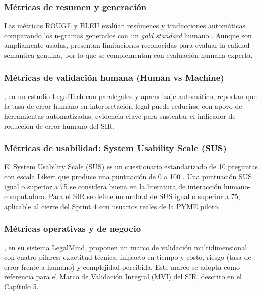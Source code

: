 \documentclass[12pt,a4paper,oneside]{report}
\begin{document}
\subsubsection{Métricas de resumen y generación}\label{subsubsec:metricas-resumen-generacion}

Las métricas ROUGE y BLEU evalúan resúmenes y traducciones automáticas comparando los n-gramas generados con un \textit{gold standard} humano \parencite{lin2004,papineni2002}. Aunque son ampliamente usadas, presentan limitaciones reconocidas para evaluar la calidad semántica genuina, por lo que se complementan con evaluación humana experta.

\subsubsection{Métricas de validación humana (Human vs Machine)}\label{subsubsec:metricas-validacion-humana}

\textcite{orosz2021}, en un estudio LegalTech con paralegales y aprendizaje automático, reportan que la tasa de error humano en interpretación legal puede reducirse con apoyo de herramientas automatizadas, evidencia clave para sustentar el indicador de reducción de error humano del SIR.

\subsubsection{Métricas de usabilidad: System Usability Scale (SUS)}\label{subsubsec:metricas-usabilidad-sus}

El System Usability Scale (SUS) es un cuestionario estandarizado de 10 preguntas con escala Likert que produce una puntuación de 0 a 100 \parencite{brooke1996}. Una puntuación SUS igual o superior a 75 se considera buena en la literatura de interacción humano-computadora. Para el SIR se define un umbral de SUS igual o superior a 75, aplicable al cierre del Sprint 4 con usuarios reales de la PYME piloto.

\subsubsection{Métricas operativas y de negocio}\label{subsubsec:metricas-operativas-negocio}

\textcite{raju2025}, en su sistema LegalMind, proponen un marco de validación multidimensional con cuatro pilares: exactitud técnica, impacto en tiempo y costo, riesgo (tasa de error frente a humano) y complejidad percibida. Este marco se adopta como referencia para el Marco de Validación Integral (MVI) del SIR, descrito en el Capítulo 5.
\end{document}
